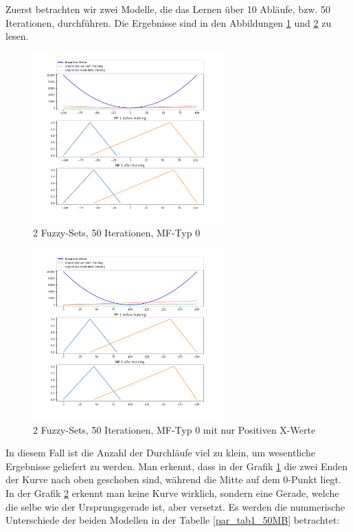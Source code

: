 {Zuerst betrachten wir zwei Modelle, die das Lernen über 10 Abläufe, bzw. 50 Iterationen, durchführen. Die Ergebnisse sind in den Abbildungen \ref{par_1000_50IT} und \ref{par_pos_1000_50IT} zu lesen.
\begin{figure}[htbp]
	\centering
	\includegraphics[width=0.65\textwidth]{images/parabola_1000/Mini-Batch/parabola_1000 1 Input 2 Sets 50 Epochs Mini-Batch Gradient Descent two equations mf.png}
	\caption{2 Fuzzy-Sets, 50 Iterationen, MF-Typ 0}
	\label{par_1000_50IT}
\end{figure}
\begin{figure}[htbp]
	\centering
	\includegraphics[width=0.65\textwidth]{images/parabola_positive/Mini-Batch/parabola_positive 1 Input 2 Sets 50 Epochs Mini-Batch Gradient Descent two equations mf.png}
	\caption{2 Fuzzy-Sets, 50 Iterationen, MF-Typ 0 mit nur Positiven X-Werte}
	\label{par_pos_1000_50IT}
\end{figure}

In diesem Fall ist die Anzahl der Durchläufe viel zu klein, um wesentliche Ergebnisse geliefert zu werden. Man erkennt, dass in der Grafik \ref{par_1000_50IT} die zwei Enden der Kurve nach oben geschoben sind, während die Mitte auf dem 0-Punkt liegt. In der Grafik \ref{par_pos_1000_50IT} erkennt man keine Kurve wirklich, sondern eine Gerade, welche die selbe wie der Ursprungsgerade ist, aber versetzt. Es werden die nummerische Unterschiede der beiden Modellen in der Tabelle \ref{par_tab1_50MB} betrachtet:

}
